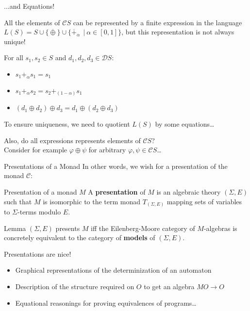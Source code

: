 \documentclass{beamer}
\newcommand{\C}{\mathcal C}
\begin{document}
\begin{frame}{...and Equations!}

All the elements of $\C S$ can be represented by a finite expression in the language $L(S) = S \cup \{ \overline \oplus \} \cup \{\overline +_\alpha\ \ | \ \alpha \in [0,1]\}$, \alert{ but this representation is not always unique!} \pause
    
    \begin{example}
         For all $s_1, s_2 \in S$ and $d_1, d_2, d_3 \in \mathcal D S$:

        \begin{itemize}
            \item $ s_1 +_\alpha  s_1 = s_1$
            \item $ s_1  +_\alpha  s_2 =  s_2 +_{(1-\alpha)}  s_1$
             \item $(d_1  \oplus d_2)  \oplus d_3 = d_1  \oplus (d_2  \oplus d_3)$ \pause
        \end{itemize}
    \end{example}
   

To ensure uniqueness, we need to quotient $L(S)$ by some equations\ldots \vspace{\baselineskip}\pause

\alert{Also, do all expressions represents elements of $\C S$?}\\ Consider for example $\varphi \oplus \psi$ for arbitrary $\varphi, \psi\in \C S$\ldots


\end{frame}

\begin{frame}{Presentations of a Monad}
In other words, we wish for a presentation of the monad $\C$:

\begin{block}{Presentation of a monad $M$}
    A \textbf{presentation} of $M$ is an algebraic theory $(\Sigma, E)$ such that $M$ is isomorphic to the term monad  \(T_{(\Sigma, E)}\) mapping sets of variables to \(\Sigma\)-terms modulo \(E\).
\end{block}

\pause 

\begin{block}{Lemma}
$(\Sigma, E)$ presents $M$ iff the Eilenberg-Moore category of \(M\)-algebras is concretely equivalent to the category of \textbf{models} of \((\Sigma, E)\).%
\end{block}

\pause

Presentations are nice!
\begin{itemize}
    \item Graphical representations of the determinization of an automaton
    \item Description of the structure required on $O$ to get an algebra $MO \to O$
    \item Equational reasonings for proving equivalences of programs\ldots
\end{itemize}

\end{frame}
\end{document}
